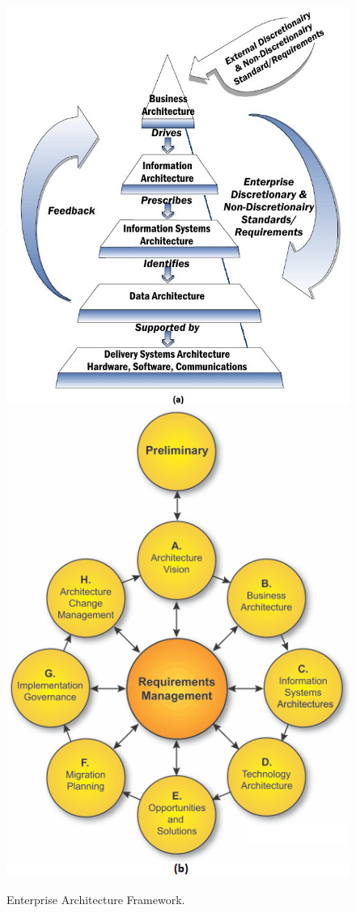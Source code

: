 \begin{figure}[htbp]
	\centering
	\includegraphics[scale = 0.4]{images/EAF_scheme.jpg}\qquad\qquad
	\includegraphics[scale = 0.5]{images/EAF_iterative_model}
	\caption{Enterprise Architecture Framework.}
	\label{img:EAF}
\end{figure}
